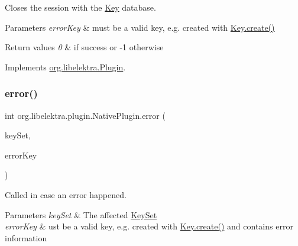 Closes the session with the \hyperlink{classorg_1_1libelektra_1_1Key}{Key} database. 


\begin{DoxyParams}{Parameters}
{\em error\+Key} & must be a valid key, e.\+g. created with \hyperlink{classorg_1_1libelektra_1_1Key_af407cf43625618af4e7fb2576037fcfc}{Key.\+create()} \\
\hline
\end{DoxyParams}

\begin{DoxyRetVals}{Return values}
{\em 0} & if success or -\/1 otherwise \\
\hline
\end{DoxyRetVals}


Implements \hyperlink{interfaceorg_1_1libelektra_1_1Plugin_aa5d4abf6ffd0d477d6972b13bed05d41}{org.\+libelektra.\+Plugin}.

\mbox{\label{classorg_1_1libelektra_1_1plugin_1_1NativePlugin_a54c2753b1d17e14be39526a6ff02e34d}} 
\subsubsection{\texorpdfstring{error()}{error()}}
{\footnotesize\ttfamily int org.\+libelektra.\+plugin.\+Native\+Plugin.\+error (\begin{DoxyParamCaption}\item[{\hyperlink{classorg_1_1libelektra_1_1KeySet}{Key\+Set}}]{key\+Set,  }\item[{\hyperlink{classorg_1_1libelektra_1_1Key}{Key}}]{error\+Key }\end{DoxyParamCaption})\hspace{0.3cm}{\ttfamily [inline]}}



Called in case an error happened. 


\begin{DoxyParams}{Parameters}
{\em key\+Set} & The affected \hyperlink{classorg_1_1libelektra_1_1KeySet}{Key\+Set} \\
\hline
{\em error\+Key} & ust be a valid key, e.\+g. created with \hyperlink{classorg_1_1libelektra_1_1Key_af407cf43625618af4e7fb2576037fcfc}{Key.\+create()} and contains error information \\
\hline
\end{DoxyParams}

